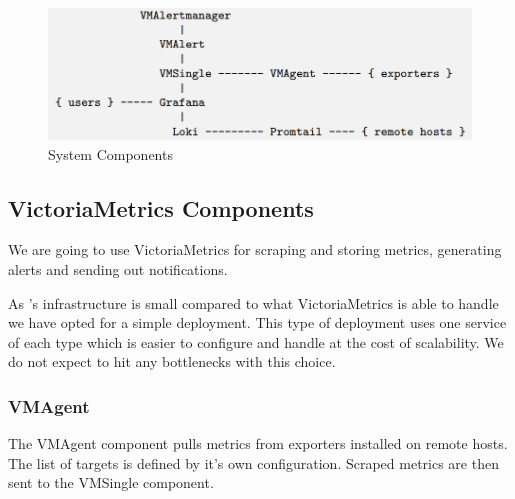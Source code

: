 
\begin{figure}[!h]
	\centering
	\includegraphics[width=150mm, keepaspectratio]{figures/arch-left.png}
	\caption{System Components}
\end{figure}

\subsection{VictoriaMetrics Components}

We are going to use VictoriaMetrics for scraping and storing metrics,
generating alerts and sending out notifications.

As \kszk's infrastructure is small compared to what VictoriaMetrics is able to
handle we have opted for a simple deployment. This type of deployment uses one
service of each type which is easier to configure and handle at the cost of
scalability. We do not expect to hit any bottlenecks with this choice.

\subsubsection{VMAgent}

The VMAgent component pulls metrics from exporters installed on remote hosts.
The list of targets is defined by it's own configuration. Scraped metrics are
then sent to the VMSingle component.

